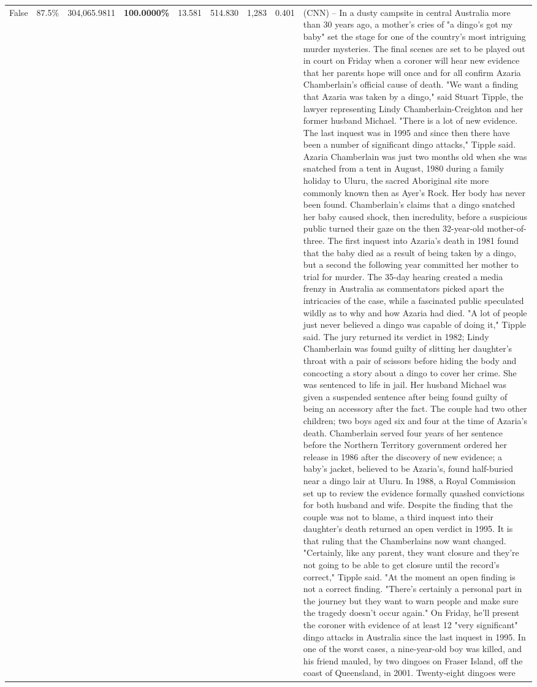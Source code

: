 \begin{table}[H]
\begin{tabular}{lllrlllll}
False & 87.5\% & 304,065.9811 & \bfseries \color{red} 100.0000\% & 13.581 & 514.830 & 1,283 & 0.401 & (CNN) -- In a dusty campsite in central Australia more than 30 years ago, a mother's cries of "a dingo's got my baby" set the stage for one of the country's most intriguing murder mysteries. The final scenes are set to be played out in court on Friday when a coroner will hear new evidence that her parents hope will once and for all confirm Azaria Chamberlain's official cause of death. "We want a finding that Azaria was taken by a dingo," said Stuart Tipple, the lawyer representing Lindy Chamberlain-Creighton and her former husband Michael. "There is a lot of new evidence. The last inquest was in 1995 and since then there have been a number of significant dingo attacks," Tipple said. Azaria Chamberlain was just two months old when she was snatched from a tent in August, 1980 during a family holiday to Uluru, the sacred Aboriginal site more commonly known then as Ayer's Rock. Her body has never been found. Chamberlain's claims that a dingo snatched her baby caused shock, then incredulity, before a suspicious public turned their gaze on the then 32-year-old mother-of-three. The first inquest into Azaria's death in 1981 found that the baby died as a result of being taken by a dingo, but a second the following year committed her mother to trial for murder. The 35-day hearing created a media frenzy in Australia as commentators picked apart the intricacies of the case, while a fascinated public speculated wildly as to why and how Azaria had died. "A lot of people just never believed a dingo was capable of doing it," Tipple said. The jury returned its verdict in 1982; Lindy Chamberlain was found guilty of slitting her daughter's throat with a pair of scissors before hiding the body and concocting a story about a dingo to cover her crime. She was sentenced to life in jail. Her husband Michael was given a suspended sentence after being found guilty of being an accessory after the fact. The couple had two other children; two boys aged six and four at the time of Azaria's death. Chamberlain served four years of her sentence before the Northern Territory government ordered her release in 1986 after the discovery of new evidence; a baby's jacket, believed to be Azaria's, found half-buried near a dingo lair at Uluru. In 1988, a Royal Commission set up to review the evidence formally quashed convictions for both husband and wife. Despite the finding that the couple was not to blame, a third inquest into their daughter's death returned an open verdict in 1995. It is that ruling that the Chamberlains now want changed. "Certainly, like any parent, they want closure and they're not going to be able to get closure until the record's correct," Tipple said. "At the moment an open finding is not a correct finding. "There's certainly a personal part in the journey but they want to warn people and make sure the tragedy doesn't occur again." On Friday, he'll present the coroner with evidence of at least 12 "very significant" dingo attacks in Australia since the last inquest in 1995. In one of the worst cases, a nine-year-old boy was killed, and his friend mauled, by two dingoes on Fraser Island, off the coast of Queensland, in 2001. Twenty-eight dingoes were 
\end{tabular}
\end{table}
